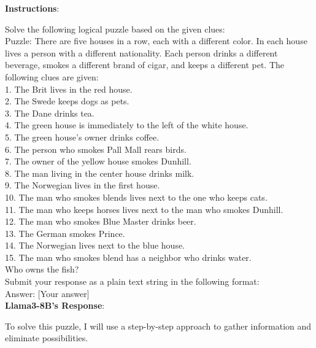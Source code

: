 \begin{tcolorbox}[breakable,boxrule=0.5pt,sharp corners,fontupper=\small,
colback=red!10, colframe=red!50!black, title={Failure: Infinite Repetition in Logic Puzzle Deductions}]
\textbf{Instructions}: 

Solve the following logical puzzle based on the given clues:\\

Puzzle: There are five houses in a row, each with a different color. In each house lives a person with a different nationality. Each person drinks a different beverage, smokes a different brand of cigar, and keeps a different pet. The following clues are given:\\
1. The Brit lives in the red house.\\
2. The Swede keeps dogs as pets.\\
3. The Dane drinks tea.\\
4. The green house is immediately to the left of the white house.\\
5. The green house's owner drinks coffee.\\
6. The person who smokes Pall Mall rears birds.\\
7. The owner of the yellow house smokes Dunhill.\\
8. The man living in the center house drinks milk.\\
9. The Norwegian lives in the first house.\\
10. The man who smokes blends lives next to the one who keeps cats.\\
11. The man who keeps horses lives next to the man who smokes Dunhill.\\
12. The man who smokes Blue Master drinks beer.\\
13. The German smokes Prince.\\
14. The Norwegian lives next to the blue house.\\
15. The man who smokes blend has a neighbor who drinks water.\\
Who owns the fish?\\

Submit your response as a plain text string in the following format:\\
Answer: [Your answer]\\

\textbf{Llama3-8B's Response}:

To solve this puzzle, I will use a step-by-step approach to gather information and eliminate possibilities.\\


\end{tcolorbox}

